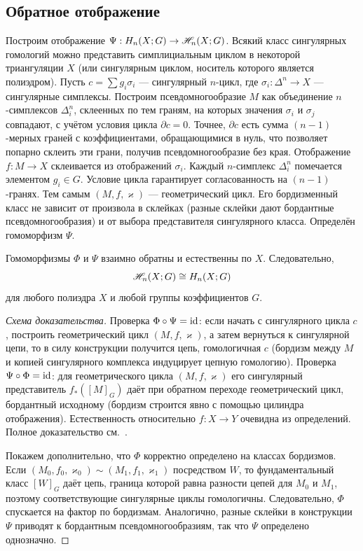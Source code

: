\documentclass[12pt, twoside]{article}
\begin{document}
\subsection{Обратное отображение}

Построим отображение $\Psi : H_n(X;G) \to \mathscr{H}_n(X;G)$.  Всякий класс сингулярных гомологий можно представить симплициальным циклом в некоторой триангуляции $X$ (или сингулярным циклом, носитель которого является полиэдром). Пусть $c = \sum g_i \sigma_i$ --- сингулярный $n$-цикл, где $\sigma_i : \Delta^n \to X$ --- сингулярные симплексы. Построим псевдомногообразие $M$ как объединение $n$-симплексов $\Delta_i^n$, склеенных по тем граням, на которых значения $\sigma_i$ и $\sigma_j$ совпадают, с учётом условия цикла $\partial c = 0$. Точнее, $\partial c$ есть сумма $(n-1)$-мерных граней с коэффициентами, обращающимися в нуль, что позволяет попарно склеить эти грани, получив псевдомногообразие без края. Отображение $f: M \to X$ склеивается из отображений $\sigma_i$. Каждый $n$-симплекс $\Delta_i^n$ помечается элементом $g_i \in G$. Условие цикла гарантирует согласованность на $(n-1)$-гранях. Тем самым $(M,f,\varkappa)$ --- геометрический цикл. Его бордизменный класс не зависит от произвола в склейках (разные склейки дают бордантные псевдомногообразия) и от выбора представителя сингулярного класса. Определён гомоморфизм $\Psi$.

\begin{theorem}
Гомоморфизмы $\Phi$ и $\Psi$ взаимно обратны и естественны по $X$. Следовательно,
\begin{equation}\label{eq:BRSiso}
\mathscr{H}_n(X;G) \cong H_n(X;G)
\end{equation}
для любого полиэдра $X$ и любой группы коэффициентов $G$.
\end{theorem}
\begin{proof}[Схема доказательства]
Проверка $\Phi \circ \Psi = \operatorname{id}$: если начать с сингулярного цикла $c$, построить геометрический цикл $(M,f,\varkappa)$, а затем вернуться к сингулярной цепи, то в силу конструкции получится цепь, гомологичная $c$ (бордизм между $M$ и копией сингулярного комплекса индуцирует цепную гомологию). Проверка $\Psi \circ \Phi = \operatorname{id}$: для геометрического цикла $(M,f,\varkappa)$ его сингулярный представитель $f_*([M]_G)$ даёт при обратном переходе геометрический цикл, бордантный исходному (бордизм строится явно с помощью цилиндра отображения). Естественность относительно $f:X\to Y$ очевидна из определений. Полное доказательство см.~\cite[Гл.~II, теорема~4.1]{BRS}.\footnotemark

Покажем дополнительно, что $\Phi$ корректно определено на классах бордизмов. Если $(M_0,f_0,\varkappa_0)\sim (M_1,f_1,\varkappa_1)$ посредством $W$, то фундаментальный класс $[W]_G$ даёт цепь, граница которой равна разности цепей для $M_0$ и $M_1$, поэтому соответствующие сингулярные циклы гомологичны. Следовательно, $\Phi$ спускается на фактор по бордизмам. Аналогично, разные склейки в конструкции $\Psi$ приводят к бордантным псевдомногообразиям, так что $\Psi$ определено однозначно.
\end{proof}
\end{document}
